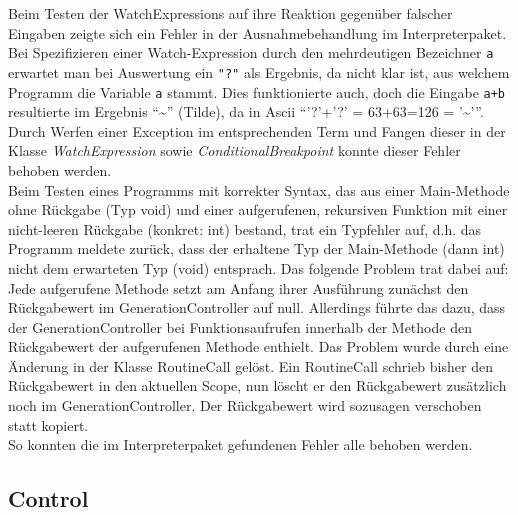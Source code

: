\documentclass[parskip=full]{scrartcl}
\begin{document}
Beim Testen der WatchExpressions auf ihre Reaktion gegenüber falscher Eingaben zeigte sich ein Fehler in der Ausnahmebehandlung im Interpreterpaket. Bei Spezifizieren einer Watch-Expression durch den mehrdeutigen Bezeichner \texttt{a} erwartet man bei Auswertung ein \texttt{"?"} als Ergebnis, da nicht klar ist, aus welchem Programm die Variable \texttt{a} stammt. Dies funktionierte auch, doch die Eingabe \texttt{a+b} resultierte im Ergebnis \enquote{\~{}} (Tilde), da in Ascii \enquote{'?'+'?' = 63+63=126 = '\~{}'}.
Durch Werfen einer Exception im entsprechenden Term und Fangen dieser in der Klasse \textit{WatchExpression} sowie \textit{ConditionalBreakpoint} konnte dieser Fehler behoben werden.
\\
Beim Testen eines Programms mit korrekter Syntax, das aus einer Main-Methode ohne Rückgabe (Typ void) und einer aufgerufenen, rekursiven Funktion mit einer nicht-leeren Rückgabe (konkret: int) bestand, trat ein Typfehler auf, d.h. das Programm meldete zurück, dass der erhaltene Typ der Main-Methode (dann int) nicht dem erwarteten Typ (void) entsprach.
Das folgende Problem trat dabei auf: Jede aufgerufene Methode setzt am Anfang ihrer Ausführung zunächst den Rückgabewert im GenerationController auf null. Allerdings führte das dazu, dass der GenerationController bei Funktionsaufrufen innerhalb der Methode den Rückgabewert der aufgerufenen Methode enthielt.
Das Problem wurde durch eine Änderung in der Klasse RoutineCall gelöst. Ein RoutineCall schrieb bisher den Rückgabewert in den aktuellen Scope, nun löscht er den Rückgabewert zusätzlich noch im GenerationController. Der Rückgabewert wird sozusagen verschoben statt kopiert.\\

So konnten die im Interpreterpaket gefundenen Fehler alle behoben werden.
\subsection{Control}
\end{document}
